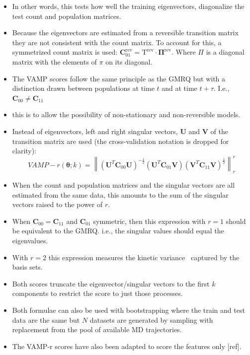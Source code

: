 \documentclass[journal=jacsat,manuscript=article]{achemso}
\begin{document}
\begin{itemize}
    \item In other words, this tests how well the training eigenvectors, diagonalize the test count and population matrices. 
    \item Because the eigenvectors are estimated from a reversible transition matrix they are not consistent with the count matrix.  To account for this, a symmetrized count matrix is used: $\mathbf{C}_{01}^{\mathrm{rev}} = \mathrm{T}^{\mathrm{rev}}\cdot \bm{\Pi}^{\mathrm{rev}}$.  Where $\Pi$ is a diagonal matrix with the elements of $\pi$ on its diagonal. 
    \item The VAMP scores follow the same principle as the GMRQ but with a distinction drawn between populations at time $t$ and at time $t+\tau$. I.e., $\mathbf{C}_{00} \neq \mathbf{C}_{11}$
    \item this is to allow the possibility of non-stationary and non-reversible models.
    \item Instead of eigenvectors, left and right singular vectors, $\mathbf{U}$ and $\mathbf{V}$ of the transition matrix are used (the cross-validation notation is dropped for clarity): 
    \begin{equation}
         VAMP-r(\bm{\theta}; k) = \left \| (\mathbf{U}^{T}\mathbf{C}_{00}\mathbf{U})^{-\frac{1}{2}}(\mathbf{U}^{T}\mathbf{C}_{01}\mathbf{V})(\mathbf{V}^{T}\mathbf{C}_{11}\mathbf{V})^{\frac{1}{2}} \right \|_{r}^{r}
    \end{equation}\label{eqn:vamp_score_def}
    \item When the count and population matrices and the singular vectors are all estimated from the same data, this amounts to the sum of the singular vectors raised to the power of $r$.  
    \item When $\mathbf{C}_{00} = \mathbf{C}_{11}$ and $\mathbf{C}_{01}$ symmetric, then this expression with $r=1$ should be equivalent to the GMRQ.  i.e., the singular values should equal the eigenvalues.  
    \item With $r=2$ this expression measures the kinetic variance~\cite{noeKineticDistanceKinetic2015} captured by the basis sets. 
    \item Both scores truncate the eigenvector/singular vectors to the first $k$ components to restrict the score to just those processes. 
    \item Both formulae can also be used with bootstrapping where the train and test data are the same but $N$ datasets are generated by sampling with replacement from the pool of available MD trajectories.   
    \item The VAMP-r scores have also been adapted to score the features only [ref]. 
\end{itemize}
\end{document}
